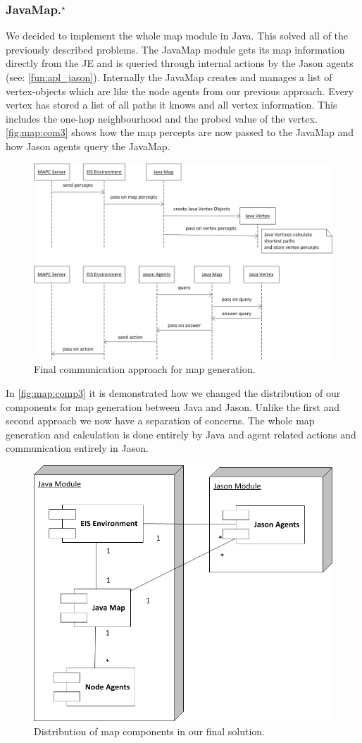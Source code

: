 \subsubsection[JavaMap]{JavaMap.$^\star$}\label{alg:map_javamap}
We decided to implement the whole map module in Java.
This solved all of the previously described problems.
The JavaMap module gets its map information directly from the JE and is queried through internal actions by the Jason agents (see: \autoref{fun:apl_jason}).
Internally the JavaMap creates and manages a list of vertex-objects which are like the node agents from our previous approach.
Every vertex has stored a list of all paths it knows and all vertex information.
This includes the one-hop neighbourhood and the probed value of the vertex.
\autoref{fig:map:com3} shows how the map percepts are now passed to the JavaMap and how Jason agents query the JavaMap.
\begin{figure}
  \centering
  \includegraphics[width=\linewidth]{images/map_com_3.png}
  \caption{Final communication approach for map generation.}
  \label{fig:map:com3}
\end{figure}

In \autoref{fig:map:comp3} it is demonstrated how we changed the distribution of our components for map generation between Java and Jason. Unlike the first and second approach we now have a separation of concerns. The whole map generation and calculation is done entirely by Java and agent related actions and communication entirely in Jason.
\begin{figure}
  \centering
  \includegraphics[width=0.6\linewidth]{images/map_comp_3.png}
  \caption{Distribution of map components in our final solution.}
  \label{fig:map:comp3}
\end{figure}

